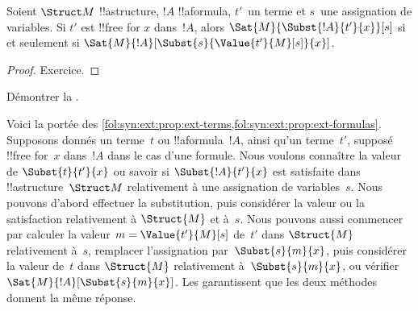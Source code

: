 \documentclass[../../../include/open-logic-section]{subfiles}
\begin{document}
\begin{prop} Soient $\Struct M$
!!a{structure}, $!A$ !!a{formula}, $t'$~un terme et $s$~une
assignation de variables. Si $t'$ est !!{free for} $x$ dans~$!A$,
alors $\Sat{M}{\Subst{!A}{t'}{x}}[s]$ si et seulement si
$\Sat{M}{!A}[\Subst{s}{\Value{t'}{M}[s]}{x}]$.
\end{prop}

\begin{proof}
Exercice.
\end{proof}

\begin{prob}
Démontrer la .
\end{prob}

\begin{explain}
  Voici la portée des
  \cref{fol:syn:ext:prop:ext-terms,fol:syn:ext:prop:ext-formulas}.
  Supposons donnés un terme~$t$ ou !!a{formula}~$!A$, ainsi qu'un
  terme~$t'$, supposé !!{free for}~$x$ dans~$!A$ dans le cas d'une formule. Nous voulons connaître la valeur de
  $\Subst{t}{t'}{x}$ ou savoir si $\Subst{!A}{t'}{x}$ est satisfaite
  dans !!a{structure}~$\Struct M$ relativement à une assignation
  de variables~$s$. Nous pouvons d'abord effectuer la substitution,
  puis considérer la valeur ou la satisfaction relativement à
  $\Struct{M}$ et à~$s$. Nous pouvons aussi commencer par calculer
  la valeur $m = \Value{t'}{M}[s]$ de~$t'$ dans $\Struct{M}$
  relativement à~$s$, remplacer l'assignation par~$\Subst{s}{m}{x}$,
  puis considérer la valeur de~$t$ dans $\Struct{M}$ relativement
  à~$\Subst{s}{m}{x}$, ou vérifier
  $\Sat{M}{!A}[\Subst{s}{m}{x}]$.
  Les 
  garantissent que les deux méthodes donnent la même réponse.
\end{explain}
\end{document}
